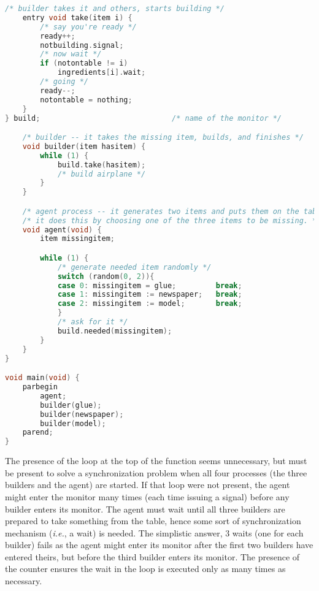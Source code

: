 \documentclass[ecs150,spring2022]{ucdclass3}
\begin{document}
\begin{enumerate}[start=4]
\begin{ansenv}
\begin{lstlisting}[language=C,morekeywords={parbegin,parend,wait,signal,entry,condition},tabsize=4]
	/* builder takes it and others, starts building */
	entry void take(item i) {
		/* say you're ready */
		ready++;
		notbuilding.signal;
		/* now wait */
		if (notontable != i)
			ingredients[i].wait;
		/* going */
		ready--;
		notontable = nothing;
	}
} build;                              /* name of the monitor */

	/* builder -- it takes the missing item, builds, and finishes */
	void builder(item hasitem) {
		while (1) {
			build.take(hasitem);
			/* build airplane */
		}
	}

	/* agent process -- it generates two items and puts them on the table; */
	/* it does this by choosing one of the three items to be missing. */
	void agent(void) {
		item missingitem;

		while (1) {
			/* generate needed item randomly */
			switch (random(0, 2)){
			case 0:	missingitem = glue;			break;
			case 1:	missingitem := newspaper;	break;
			case 2:	missingitem := model;		break;
			}
			/* ask for it */
			build.needed(missingitem);
		}
	}
}

void main(void) {
	parbegin
		agent;
		builder(glue);
		builder(newspaper);
		builder(model);
	parend;
}
\end{lstlisting}

The presence of the  loop at the top of the function  seems unnecessary, but must be present to solve a synchronization problem when all four processes (the three builders and the agent) are started.  If that loop were not present, the agent might enter the monitor many times (each time issuing a signal) before any builder enters its monitor.  The agent must wait until all three builders are prepared to take something from the table, hence some sort of synchronization mechanism (\textit{i.e.}, a wait) is needed.  The simplistic answer, 3 waits (one for each builder) fails as the agent might enter its monitor after the first two builders have entered theirs, but before the third builder enters its monitor.  The presence of the counter  ensures the wait in the  loop is executed only as many times as necessary.


\end{ansenv}
\end{enumerate}
\end{document}
